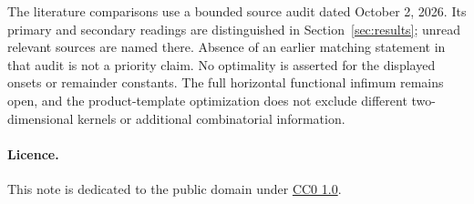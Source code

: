 \documentclass[10pt]{article}
\numberwithin{equation}{section}
\theoremstyle{remark}
\begin{document}
The literature comparisons use a bounded source audit dated
October 2, 2026. Its primary and secondary readings are distinguished
in Section~\ref{sec:results}; unread relevant sources are named there.
Absence of an earlier matching statement in that audit is not a
priority claim. No optimality is asserted for the displayed onsets
or remainder constants. The full horizontal functional infimum remains
open, and the product-template optimization does not exclude different
two-dimensional kernels or additional combinatorial information.

\paragraph{Licence.}
This note is dedicated to the public domain under
\href{https://creativecommons.org/publicdomain/zero/1.0/}{CC0 1.0}.
\end{document}
